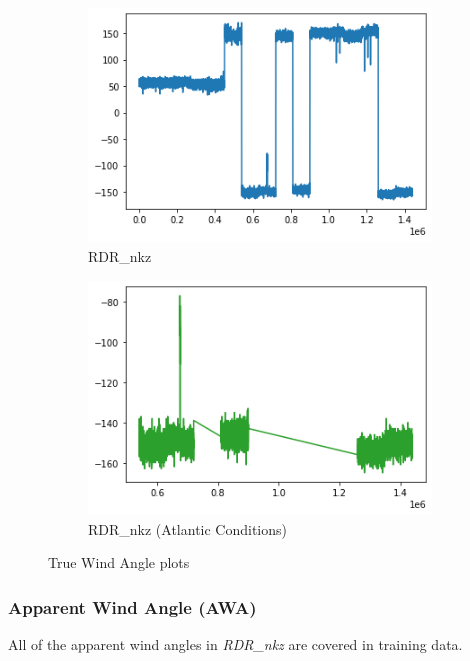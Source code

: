 \begin{figure}[h]
     \centering
     \begin{subfigure}[t]{0.49\textwidth}
         \centering
         \includegraphics[width=\textwidth]{figures/distributions/RDR-TWA.png}
         \caption{RDR\_nkz}
     \end{subfigure}
     \hfill
     \begin{subfigure}[t]{0.49\textwidth}
         \centering
         \includegraphics[width=\textwidth]{figures/distributions/RDR-atlantic-TWA.png}
         \caption{RDR\_nkz (Atlantic Conditions)}
     \end{subfigure}
        \label{fig:rdr-tws}
        \caption{True Wind Angle plots}
\end{figure}

\clearpage
\subsubsection{Apparent Wind Angle (AWA)}
All of the apparent wind angles in \textit{RDR\_nkz} are covered in training data.

